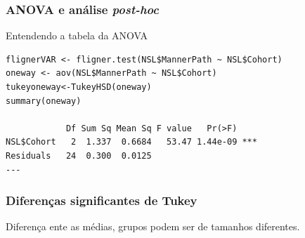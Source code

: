 \documentclass[graphics,14pt]{beamer}
\begin{document}
\begin{frame}[t,fragile=singleslide]
\frametitle{ANOVA e análise \textit{post-hoc}}

Entendendo a tabela da ANOVA


\begin{lstlisting}
flignerVAR <- fligner.test(NSL$MannerPath ~ NSL$Cohort)
oneway <- aov(NSL$MannerPath ~ NSL$Cohort)
tukeyoneway<-TukeyHSD(oneway)
summary(oneway)

            Df Sum Sq Mean Sq F value   Pr(>F)    
NSL$Cohort   2  1.337  0.6684   53.47 1.44e-09 ***
Residuals   24  0.300  0.0125                     
---
\end{lstlisting}

\end{frame}
\begin{frame}[t,fragile=singleslide]
\frametitle{Diferenças significantes de Tukey}

Diferença ente as médias, grupos podem ser de tamanhos diferentes.
\vspace{1cm}

\end{frame}
\end{document}
